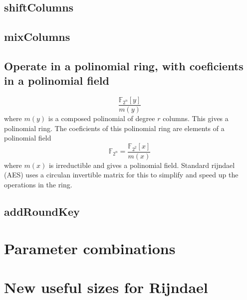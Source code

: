 \documentclass[a4paper,twoside]{llncs}
\newcommand{\Fpn}[2]{\ensuremath{\mathbb{F}_{#1^#2}}}
\newcommand{\Fpnm}[2]{\ensuremath{\frac{\Fpn{2}{#1}[#2]}{m(#2)}}}
\begin{document}
\subsection{shiftColumns}

\subsection{mixColumns}
\subsection{Operate in a polinomial ring, with coeficients in a polinomial field}
$$\Fpnm{n}{y}\label{eq:polinomialRing}$$ where $m(y)$ is a composed polinomial of degree $r$ columns. This gives a polinomial ring. The coeficients of this polinomial ring are elements of a polinomial field $$\Fpn{2}{n}=\Fpnm{2}{x}\label{eq:polinomialField}$$ where $m(x)$ is irreductible and gives a polinomial field.
Standard rijndael (AES) uses a circulan invertible matrix for this to simplify and speed up the operations in the ring.

\subsection{addRoundKey}

\section{Parameter combinations}

\section{New useful sizes for Rijndael}
\cite{Daemen:1999:EBC:1267115.1267119}
\end{document}
